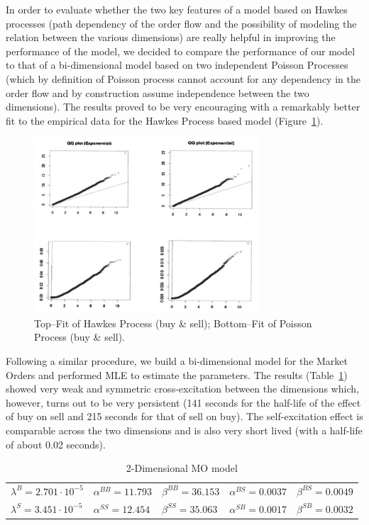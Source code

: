 In order to evaluate whether the two key features of a model based on Hawkes processes (path dependency of the order flow and the possibility of modeling the relation between the various dimensions) are really helpful in improving the performance of the model, we decided to compare the performance of our model to that of a bi-dimensional model based on two independent Poisson Processes (which by definition of Poisson process cannot account for any dependency in the order flow and by construction assume independence between the two dimensions). The results proved to be very encouraging with a remarkably better fit to the empirical data for the Hawkes Process based model (Figure~\ref{fig:4hawkes6}).
	\begin{figure}[!ht]
   	\centering
   	\includegraphics[width=0.75\textwidth]{chapters/chapter_trade_data_models/figures/4hawkes6.png} 
   	\caption{Top--Fit of Hawkes Process (buy \& sell); Bottom--Fit of Poisson Process (buy \& sell). \label{fig:4hawkes6}}
	\end{figure}


Following a similar procedure, we build a bi-dimensional model for the Market Orders and performed MLE to estimate the parameters. The results (Table~\ref{tab:2dimmomod}) showed very weak and symmetric cross-excitation between the dimensions which, however, turns out to be very persistent (141 seconds for the half-life of the effect of buy on sell and 215 seconds for that of sell on buy). The self-excitation effect is comparable across the two dimensions and is also very short lived (with a half-life of about 0.02 seconds).
	\begin{table}
	\centering
	\caption{2-Dimensional MO model \label{tab:2dimmomod}}
	\begin{tabular}{lllll}  
	$\lambda^B=2.701 \cdot 10^{-5}$ & $\alpha^{BB}=11.793$ & $\beta^{BB}=36.153$ & $\alpha^{BS}=0.0037$ & $\beta^{BS}=0.0049$ \\
	$\lambda^S=3.451 \cdot 10^{-5}$ & $\alpha^{SS}=12.454$ & $\beta^{SS}=35.063$ & $\alpha^{SB}=0.0017$ & $\beta^{SB}=0.0032$
	\end{tabular}
	\end{table}
	

